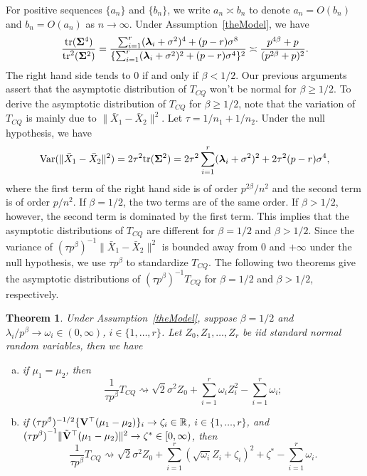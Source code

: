 \documentclass[times,sort&compress,3p]{elsarticle}
\newcommand{\mytr}{ {\rm tr} }
\newcommand{\myVar}{ {\rm Var} }
\newcommand{\bfsym}[1]{\ensuremath{\boldsymbol{#1}}}
\def\blambda {\bfsym {\lambda}}        \def\bLambda {\bfsym {\Lambda}}
\theoremstyle{plain}
\newtheorem{theorem}{\quad\quad Theorem}
\theoremstyle{definition}
\theoremstyle{remark}
\begin{document}
For positive sequences $\{a_n\}$ and $\{b_n\}$, we write $a_n\asymp b_n$ to denote $a_n=O(b_n)$ and $b_n=O(a_n)$ as $n\to \infty$.
Under Assumption~\ref{theModel}, we have
$$
\frac{\mytr(\bSigma^4)}{\mytr^2(\bSigma^2)}
=
\frac{\sum_{i=1}^r (\blambda_i+\sigma^2)^4+(p-r)\sigma^8}{\{\sum_{i=1}^r (\blambda_i+\sigma^2)^2+(p-r)\sigma^4\}^2}
\asymp 
\frac{p^{4\beta}+p}{(p^{2\beta}+p)^2}.
$$
The right hand side tends to $0$ if and only if $\beta<1/2$.
Our previous arguments assert that the asymptotic distribution of $T_{CQ}$ won't be normal for $\beta\geq 1/2$.
To derive the asymptotic distribution of $T_{CQ}$ for $\beta\geq 1/2$,
note that the variation of $T_{CQ}$ is mainly due to $\|\bar{X}_1-\bar{X}_2\|^2$.
Let $\tau=1/n_1+1/n_2$.
Under the null hypothesis, we have
$$
\myVar(\|\bar{X}_1-\bar{X}_2\|^2 )=
2\tau^2 \mytr (\bSigma^2)=2\tau^2 \sum_{i=1}^r (\blambda_i+
\sigma^2)^2
+ 2\tau^2 (p-r)\sigma^4,
$$
where the first term of the right hand side is of order $p^{2\beta}/n^2$ and the second term is of order $p/n^2$.
If $\beta=1/2$, the two terms are of the same order. 
If $\beta>1/2$, however, the second term is dominated by the first term.
This implies that the asymptotic distributions of $T_{CQ}$ are different for $\beta=1/2$ and $\beta>1/2$.
Since the variance of $(\tau p^{\beta})^{-1}\|\bar{X}_1-\bar{X}_2\|^2$ is bounded away from $0$ and $+\infty$ under the null hypothesis, we use $\tau p^{\beta}$ to standardize $T_{CQ}$.
The following two theorems give the asymptotic distributions of $(\tau p^{\beta})^{-1}T_{CQ}$ for $\beta= 1/2$ and $\beta>1/2$, respectively.
\begin{theorem}\label{Chenstheory1}
 Under Assumption~\ref{theModel},
 suppose $\beta=1/2$ and $\lambda_i/p^\beta \to \omega_i\in(0,\infty)$, $i\in \{1,\ldots,r\}$.
    Let $Z_{0},Z_1,\ldots,Z_{r}$ be iid standard normal random variables,
     then we have
     \begin{enumerate}[(a)]
         \item
             if $\mu_1=\mu_2$, then
    $$
        \frac{1}{\tau p^{\beta}} T_{CQ}
        \rightsquigarrow
\sqrt{2}\sigma^2 Z_0
+
        \sum_{i=1}^r \omega_i Z_i^2
            -
        \sum_{i=1}^r \omega_i;
    $$
         \item
             if $(\tau p^{\beta})^{-1/2}\{\mathbf{V}^\top  (\mu_1-\mu_2)\}_i\to \zeta_i\in \mathbb{R}$, $i\in \{1,\ldots,r\}$,
             and
    ${(\tau p^\beta)}^{-1}\|\tilde{\mathbf{V}}^\top  (\mu_1-\mu_2)\|^2\to \zeta^*\in [0,\infty)$, then
    $$
        \frac{1}{\tau p^{\beta}} T_{CQ}
        \rightsquigarrow
\sqrt{2}\sigma^2 Z_0+
        \sum_{i=1}^r (\sqrt{\omega_i} Z_i+\zeta_i)^2+
\zeta^*
        -
        \sum_{i=1}^r \omega_i.
    $$
     \end{enumerate}
\end{theorem}
\end{document}
